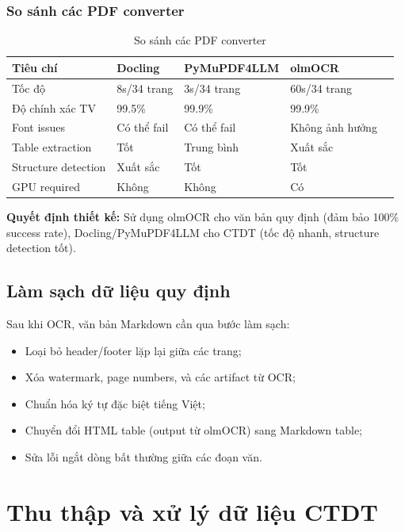 \documentclass[../DoAn.tex]{subfiles}
\begin{document}
\subsubsection{So sánh các PDF converter}
\begin{table}[h]
\centering
\begin{tabular}{|l|l|l|l|l|}
\hline
\textbf{Tiêu chí} & \textbf{Docling} & \textbf{PyMuPDF4LLM} & \textbf{olmOCR} \\
\hline
Tốc độ & 8s/34 trang & 3s/34 trang & 60s/34 trang \\
\hline
Độ chính xác TV & 99.5\% & 99.9\% & 99.9\% \\
\hline
Font issues & Có thể fail & Có thể fail & Không ảnh hưởng \\
\hline
Table extraction & Tốt & Trung bình & Xuất sắc \\
\hline
Structure detection & Xuất sắc & Tốt & Tốt \\
\hline
GPU required & Không & Không & Có \\
\hline
\end{tabular}
\caption{So sánh các PDF converter}
\end{table}

\textbf{Quyết định thiết kế:} Sử dụng olmOCR cho văn bản quy định (đảm bảo 100\% success rate), Docling/PyMuPDF4LLM cho CTDT (tốc độ nhanh, structure detection tốt).

\subsection{Làm sạch dữ liệu quy định}
Sau khi OCR, văn bản Markdown cần qua bước làm sạch:
\begin{itemize}
    \item Loại bỏ header/footer lặp lại giữa các trang;
    \item Xóa watermark, page numbers, và các artifact từ OCR;
    \item Chuẩn hóa ký tự đặc biệt tiếng Việt;
    \item Chuyển đổi HTML table (output từ olmOCR) sang Markdown table;
    \item Sửa lỗi ngắt dòng bất thường giữa các đoạn văn.
\end{itemize}

\section{Thu thập và xử lý dữ liệu CTDT}
\end{document}
